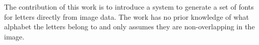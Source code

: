 \documentclass{article}
\begin{document}

The contribution of this work is to introduce a system to generate a set of fonts for letters
directly from image data. The work has no prior knowledge of what alphabet the letters belong
to and only assumes they are non-overlapping in the image.
\end{document}
